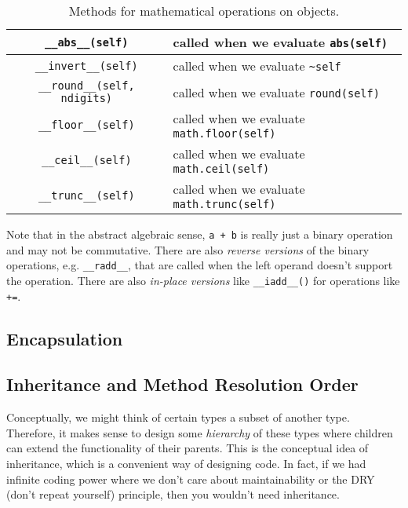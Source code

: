 \begin{definition}
\begin{table}[H]
\begin{tabular}{|c|p{8cm}|}
        \hline
        \texttt{\_\_abs\_\_(self)} & called when we evaluate \texttt{abs(self)} \\
        \hline
        \texttt{\_\_invert\_\_(self)} & called when we evaluate \texttt{\~{}self} \\
        \hline
        \texttt{\_\_round\_\_(self, ndigits)} & called when we evaluate \texttt{round(self)} \\
        \hline
        \texttt{\_\_floor\_\_(self)} & called when we evaluate \texttt{math.floor(self)} \\
        \hline
        \texttt{\_\_ceil\_\_(self)} & called when we evaluate \texttt{math.ceil(self)} \\
        \hline
        \texttt{\_\_trunc\_\_(self)} & called when we evaluate \texttt{math.trunc(self)} \\
        \hline
      \end{tabular}
      \caption{Methods for mathematical operations on objects.}
      \label{tab:mathematical_operations}
    \end{table}

    Note that in the abstract algebraic sense, \texttt{a + b} is really just a binary operation and may not be commutative. There are also \textit{reverse versions} of the binary operations, e.g. \texttt{\_\_radd\_\_}, that are called when the left operand doesn't support the operation. There are also \textit{in-place versions} like \texttt{\_\_iadd\_\_()} for operations like \texttt{+=}.  
  \end{definition}

\subsection{Encapsulation} 

  
 
\subsection{Inheritance and Method Resolution Order} 

  Conceptually, we might think of certain types a subset of another type. Therefore, it makes sense to design some \textit{hierarchy} of these types where children can extend the functionality of their parents. This is the conceptual idea of inheritance, which is a convenient way of designing code. In fact, if we had infinite coding power where we don't care about maintainability or the DRY (don't repeat yourself) principle, then you wouldn't need inheritance. 

